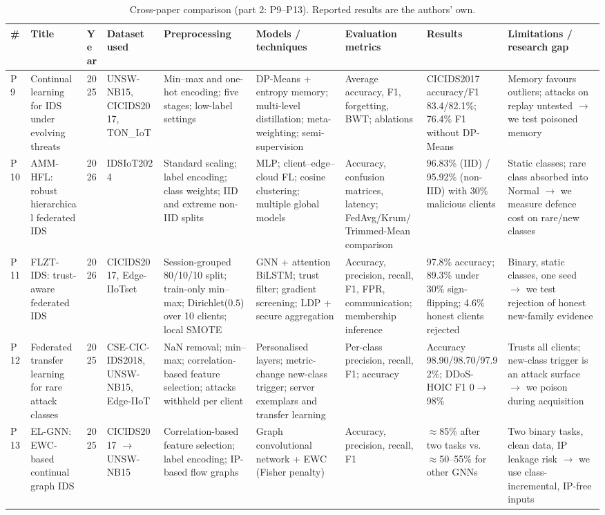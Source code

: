 \documentclass[10pt,a4paper]{article}
\begin{document}
\begin{landscape}
\begin{table}[p]
\centering\scriptsize
\caption{Cross-paper comparison (part 2: P9--P13). Reported results are the authors' own.}
\label{tab:comp2}
\begin{tabularx}{\linewidth}{L{0.6cm}L{2.9cm}L{0.6cm}Y Y Y Y Y Y}
\toprule
\# & Title & Year & Dataset used & Preprocessing & Models / techniques & Evaluation metrics & Results & Limitations / research gap\\
\midrule
P9 & Continual learning for IDS under evolving threats \cite{guo} & 2025 & UNSW-NB15, CICIDS2017, TON\_IoT & Min--max and one-hot encoding; five stages; low-label settings & DP-Means + entropy memory; multi-level distillation; meta-weighting; semi-supervision & Average accuracy, F1, forgetting, BWT; ablations & CICIDS2017 accuracy/F1 83.4/82.1\%; 76.4\% F1 without DP-Means & Memory favours outliers; attacks on replay untested $\rightarrow$ we test poisoned memory\\[3pt]
P10 & AMM-HFL: robust hierarchical federated IDS \cite{amm} & 2026 & IDSIoT2024 & Standard scaling; label encoding; class weights; IID and extreme non-IID splits & MLP; client--edge--cloud FL; cosine clustering; multiple global models & Accuracy, confusion matrices, latency; FedAvg/Krum/Trimmed-Mean comparison & 96.83\% (IID) / 95.92\% (non-IID) with 30\% malicious clients & Static classes; rare class absorbed into Normal $\rightarrow$ we measure defence cost on rare/new classes\\[3pt]
P11 & FLZT-IDS: trust-aware federated IDS \cite{flzt} & 2026 & CICIDS2017, Edge-IIoTset & Session-grouped 80/10/10 split; train-only min--max; Dirichlet($0.5$) over 10 clients; local SMOTE & GNN + attention BiLSTM; trust filter; gradient screening; LDP + secure aggregation & Accuracy, precision, recall, F1, FPR, communication; membership inference & 97.8\% accuracy; 89.3\% under 30\% sign-flipping; 4.6\% honest clients rejected & Binary, static classes, one seed $\rightarrow$ we test rejection of honest new-family evidence\\[3pt]
P12 & Federated transfer learning for rare attack classes \cite{rare} & 2025 & CSE-CIC-IDS2018, UNSW-NB15, Edge-IIoT & NaN removal; min--max; correlation-based feature selection; attacks withheld per client & Personalised layers; metric-change new-class trigger; server exemplars and transfer learning & Per-class precision, recall, F1; accuracy & Accuracy 98.90/98.70/97.92\%; DDoS-HOIC F1 0$\rightarrow$98\% & Trusts all clients; new-class trigger is an attack surface $\rightarrow$ we poison during acquisition\\[3pt]
P13 & EL-GNN: EWC-based continual graph IDS \cite{elgnn} & 2025 & CICIDS2017 $\rightarrow$ UNSW-NB15 & Correlation-based feature selection; label encoding; IP-based flow graphs & Graph convolutional network + EWC (Fisher penalty) & Accuracy, precision, recall, F1 & $\approx$85\% after two tasks vs.\ $\approx$50--55\% for other GNNs & Two binary tasks, clean data, IP leakage risk $\rightarrow$ we use class-incremental, IP-free inputs\\
\bottomrule
\end{tabularx}
\end{table}
\end{landscape}
\end{document}
